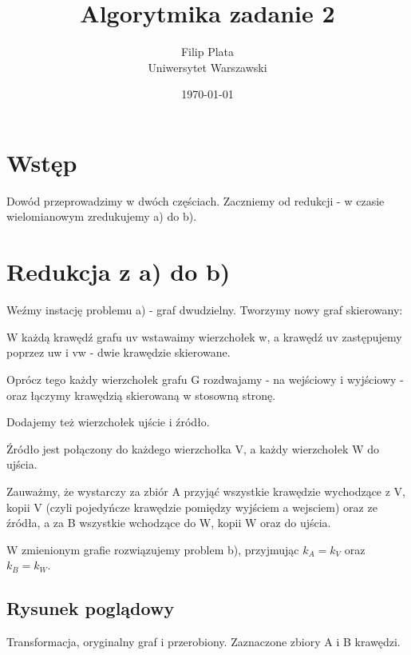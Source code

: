 \documentclass[12pt]{article}
\title{Algorytmika zadanie 2}
\author{
        Filip Plata \\
        Uniwersytet Warszawski
}
\date{\today}
\begin{document}
\maketitle

\section{Wstęp}

Dowód przeprowadzimy w dwóch częściach. Zaczniemy od redukcji - w czasie wielomianowym zredukujemy a) do b).

\section{Redukcja z a) do b)}

Weźmy instację problemu a) - graf dwudzielny. Tworzymy nowy graf skierowany:

W każdą krawędź grafu uv wstawaimy wierzchołek w, a krawędź uv zastępujemy poprzez uw i vw - dwie krawędzie skierowane.

Oprócz tego każdy wierzchołek grafu G rozdwajamy - na wejściowy i wyjściowy - oraz łączymy krawędzią skierowaną w stosowną stronę.

Dodajemy też wierzchołek ujście i źródło.

Źródło jest połączony do każdego wierzchołka V, a każdy wierzchołek W do ujścia.

Zauważmy, że wystarczy za zbiór A przyjąć wszystkie krawędzie wychodzące z V, kopii V (czyli pojedyńcze krawędzie pomiędzy wyjściem a wejsciem) oraz ze źródła, a za B wszystkie wchodzące do W, kopii W oraz do ujścia.

W zmienionym grafie rozwiązujemy problem b), przyjmując $k_{A} = k_{V}$ oraz $k_{B} = k_{W}$.

\subsection{Rysunek poglądowy}

Transformacja, oryginalny graf i przerobiony. Zaznaczone zbiory A i B krawędzi.
\end{document}
